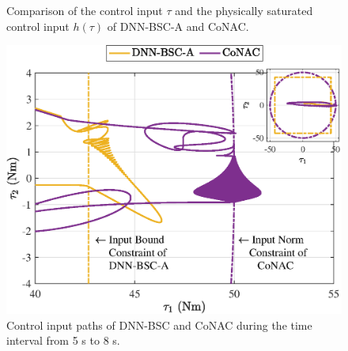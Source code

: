 \begin{figure}[!t]
    \centering
    \vfill
    \vfill
    \caption{Comparison of the control input $\tau$ and the physically saturated control input $h(\tau)$ of DNN-BSC-A and CoNAC.}
    \label{chap4:fig:control2}
\end{figure}

\begin{figure}[!t]
    \centering
    {\includegraphics[width=0.85\linewidth]{imgs/Chap4/fig16.eps}
    \caption{Control input paths of DNN-BSC and CoNAC during the time interval from 5 s to 8 s.}
    \label{chap4:fig:control_ball}}
\end{figure}

